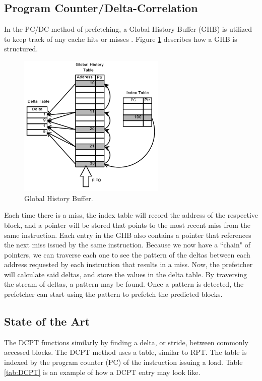 \subsection{Program Counter/Delta-Correlation}
In the PC/DC method of prefetching, a Global History Buffer (GHB) is utilized to keep track of any cache hits or misses \cite{PCDC}. Figure \ref{fig:GHB Layout} describes how a GHB is structured.
\begin{figure}[!htb]
    \centering
    \includegraphics[width = 7cm]{images/GHBexample.png}
    \caption{Global History Buffer\cite{Book}.}
    \label{fig:GHB Layout}
\end{figure}
 Each time there is a miss, the index table will record the address of the respective block, and a pointer will be stored that points to the most recent miss from the same instruction. Each entry in the GHB also contains a pointer that references the next miss issued by the same instruction. Because we now have a ``chain" of pointers, we can traverse each one to see the pattern of the deltas between each address requested by each instruction that results in a miss. Now, the prefetcher will calculate said deltas, and store the values in the delta table. By traversing the stream of deltas, a pattern may be found. Once a pattern is detected, the prefetcher can start using the pattern to prefetch the predicted blocks.
 
\subsection{State of the Art} \label{subsec:state-of-the-art}
The DCPT functions similarly by finding a delta, or stride, between commonly accessed blocks. The DCPT method uses a table, similar to RPT. The table is indexed by the program counter (PC) of the instruction issuing a load. Table \ref{tab:DCPT} is an example of how a DCPT entry may look like.

